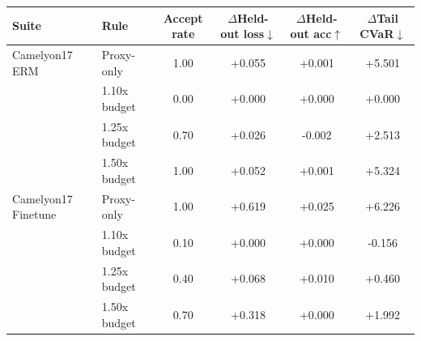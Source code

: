 \begin{tabular}{llcccc}
  \toprule
  Suite & Rule & Accept rate & $\Delta$Held-out loss$\downarrow$ & $\Delta$Held-out acc$\uparrow$ & $\Delta$Tail CVaR$\downarrow$ \\
  \midrule
  Camelyon17 ERM & Proxy-only & 1.00 & +0.055 & +0.001 & +5.501 \\
   & 1.10x budget & 0.00 & +0.000 & +0.000 & +0.000 \\
   & 1.25x budget & 0.70 & +0.026 & -0.002 & +2.513 \\
   & 1.50x budget & 1.00 & +0.052 & +0.001 & +5.324 \\
  Camelyon17 Finetune & Proxy-only & 1.00 & +0.619 & +0.025 & +6.226 \\
   & 1.10x budget & 0.10 & +0.000 & +0.000 & -0.156 \\
   & 1.25x budget & 0.40 & +0.068 & +0.010 & +0.460 \\
   & 1.50x budget & 0.70 & +0.318 & +0.000 & +1.992 \\
  \bottomrule
\end{tabular}
